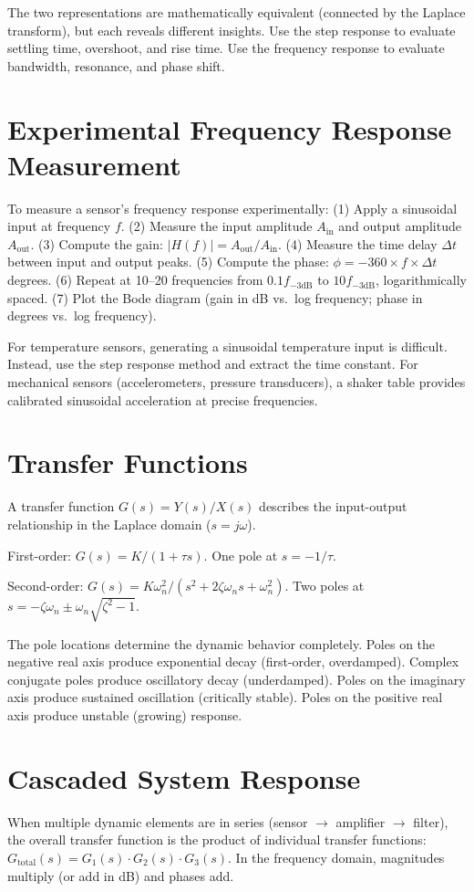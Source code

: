 \documentclass[11pt,letterpaper,twoside,openany]{book}
\begin{document}
The two representations are mathematically equivalent (connected by the Laplace transform), but each reveals different insights. Use the step response to evaluate settling time, overshoot, and rise time. Use the frequency response to evaluate bandwidth, resonance, and phase shift.

\section{Experimental Frequency Response Measurement}
To measure a sensor's frequency response experimentally: (1) Apply a sinusoidal input at frequency $f$. (2) Measure the input amplitude $A_{\text{in}}$ and output amplitude $A_{\text{out}}$. (3) Compute the gain: $|H(f)| = A_{\text{out}}/A_{\text{in}}$. (4) Measure the time delay $\Delta t$ between input and output peaks. (5) Compute the phase: $\phi = -360 \times f \times \Delta t$ degrees. (6) Repeat at 10--20 frequencies from $0.1 f_{-3\text{dB}}$ to $10 f_{-3\text{dB}}$, logarithmically spaced. (7) Plot the Bode diagram (gain in dB vs.\ log frequency; phase in degrees vs.\ log frequency).

For temperature sensors, generating a sinusoidal temperature input is difficult. Instead, use the step response method and extract the time constant. For mechanical sensors (accelerometers, pressure transducers), a shaker table provides calibrated sinusoidal acceleration at precise frequencies.

\section{Transfer Functions}
A transfer function $G(s) = Y(s)/X(s)$ describes the input-output relationship in the Laplace domain ($s = j\omega$).

First-order: $G(s) = K/(1 + \tau s)$. One pole at $s = -1/\tau$.

Second-order: $G(s) = K\omega_n^2/(s^2 + 2\zeta\omega_n s + \omega_n^2)$. Two poles at $s = -\zeta\omega_n \pm \omega_n\sqrt{\zeta^2 - 1}$.

The pole locations determine the dynamic behavior completely. Poles on the negative real axis produce exponential decay (first-order, overdamped). Complex conjugate poles produce oscillatory decay (underdamped). Poles on the imaginary axis produce sustained oscillation (critically stable). Poles on the positive real axis produce unstable (growing) response.

\section{Cascaded System Response}
When multiple dynamic elements are in series (sensor $\to$ amplifier $\to$ filter), the overall transfer function is the product of individual transfer functions: $G_{\text{total}}(s) = G_1(s) \cdot G_2(s) \cdot G_3(s)$. In the frequency domain, magnitudes multiply (or add in dB) and phases add.
\end{document}
